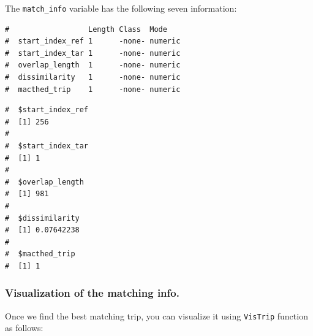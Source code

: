 \documentclass[letterpaper,9pt,twocolumn,twoside,]{pinp}
\begin{document}
The \texttt{match\_info} variable has the following seven information:

\begin{Shaded}
\begin{Highlighting}[]
\end{Highlighting}
\end{Shaded}

\begin{ShadedResult}
\begin{verbatim}
#                  Length Class  Mode   
#  start_index_ref 1      -none- numeric
#  start_index_tar 1      -none- numeric
#  overlap_length  1      -none- numeric
#  dissimilarity   1      -none- numeric
#  macthed_trip    1      -none- numeric
\end{verbatim}
\end{ShadedResult}

\begin{Shaded}
\begin{Highlighting}[]
\end{Highlighting}
\end{Shaded}

\begin{ShadedResult}
\begin{verbatim}
#  $start_index_ref
#  [1] 256
#  
#  $start_index_tar
#  [1] 1
#  
#  $overlap_length
#  [1] 981
#  
#  $dissimilarity
#  [1] 0.07642238
#  
#  $macthed_trip
#  [1] 1
\end{verbatim}
\end{ShadedResult}

\hypertarget{visualization-of-the-matching-info.}{%
\subsubsection{Visualization of the matching
info.}\label{visualization-of-the-matching-info.}}

Once we find the best matching trip, you can visualize it using
\texttt{VisTrip} function as follows:

\begin{Shaded}
\begin{Highlighting}[]
\end{Highlighting}
\end{Shaded}
\end{document}
